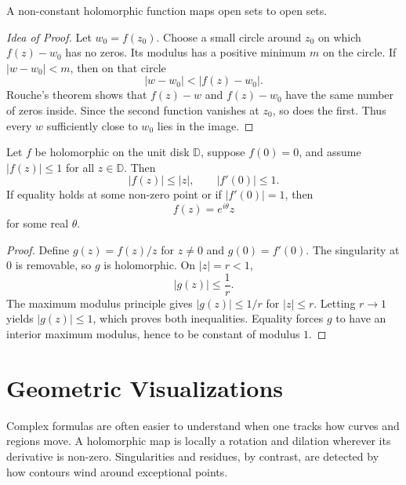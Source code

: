 \begin{theorem}
A non-constant holomorphic function maps open sets to open sets.
\end{theorem}

\begin{proof}[Idea of Proof]
Let $w_0=f(z_0)$. Choose a small circle around $z_0$ on which $f(z)-w_0$ has no zeros. Its modulus has a positive minimum $m$ on the circle. If $|w-w_0|<m$, then on that circle
\[
    |w-w_0|<|f(z)-w_0|.
\]
Rouche's theorem shows that $f(z)-w$ and $f(z)-w_0$ have the same number of zeros inside. Since the second function vanishes at $z_0$, so does the first. Thus every $w$ sufficiently close to $w_0$ lies in the image.
\end{proof}

\begin{theorem}
Let $f$ be holomorphic on the unit disk $\mathbb{D}$, suppose $f(0)=0$, and assume $|f(z)|\leq1$ for all $z\in\mathbb{D}$. Then
\[
    |f(z)|\leq|z|,
    \qquad
    |f'(0)|\leq1.
\]
If equality holds at some non-zero point or if $|f'(0)|=1$, then
\[
    f(z)=e^{i\theta}z
\]
for some real $\theta$.
\end{theorem}

\begin{proof}
Define $g(z)=f(z)/z$ for $z\neq0$ and $g(0)=f'(0)$. The singularity at $0$ is removable, so $g$ is holomorphic. On $|z|=r<1$,
\[
    |g(z)|\leq\frac1r.
\]
The maximum modulus principle gives $|g(z)|\leq1/r$ for $|z|\leq r$. Letting $r\to1$ yields $|g(z)|\leq1$, which proves both inequalities. Equality forces $g$ to have an interior maximum modulus, hence to be constant of modulus $1$.
\end{proof}

\section{Geometric Visualizations}

Complex formulas are often easier to understand when one tracks how curves and regions move. A holomorphic map is locally a rotation and dilation wherever its derivative is non-zero. Singularities and residues, by contrast, are detected by how contours wind around exceptional points.


